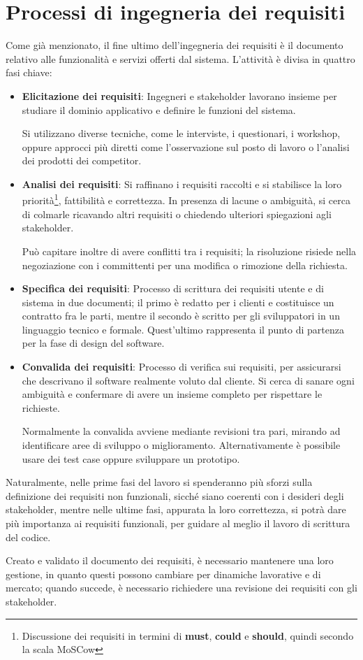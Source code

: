 \section{Processi di ingegneria dei requisiti}
Come già menzionato, il fine ultimo dell'ingegneria dei requisiti è il documento relativo alle funzionalità e servizi offerti dal sistema. L'attività è divisa in quattro fasi chiave: \begin{itemize}
	\item \textbf{Elicitazione dei requisiti}: Ingegneri e stakeholder lavorano insieme per studiare il dominio applicativo e definire le funzioni del sistema.\par
	Si utilizzano diverse tecniche, come le interviste, i questionari, i workshop, oppure approcci più diretti come l'osservazione sul posto di lavoro o l'analisi dei prodotti dei competitor.
	\item \textbf{Analisi dei requisiti}: Si raffinano i requisiti raccolti e si stabilisce la loro priorità\footnote{Discussione dei requisiti in termini di \textbf{must}, \textbf{could} e \textbf{should}, quindi secondo la scala MoSCow}, fattibilità e correttezza. In presenza di lacune o ambiguità, si cerca di colmarle ricavando altri requisiti o chiedendo ulteriori spiegazioni agli stakeholder.\par
	Può capitare inoltre di avere conflitti tra i requisiti; la risoluzione risiede nella negoziazione con i committenti per una modifica o rimozione della richiesta.
	\item \textbf{Specifica dei requisiti}: Processo di scrittura dei requisiti utente e di sistema in due documenti; il primo è redatto per i clienti e costituisce un contratto fra le parti, mentre il secondo è scritto per gli sviluppatori in un linguaggio tecnico e formale. Quest'ultimo rappresenta il punto di partenza per la fase di design del software.
	\item \textbf{Convalida dei requisiti}: Processo di verifica sui requisiti, per assicurarsi che descrivano il software realmente voluto dal cliente. Si cerca di sanare ogni ambiguità e confermare di avere un insieme completo per rispettare le richieste.\par
	Normalmente la convalida avviene mediante revisioni tra pari, mirando ad identificare aree di sviluppo o miglioramento. Alternativamente è possibile usare dei test case oppure sviluppare un prototipo.
\end{itemize}
\noindent Naturalmente, nelle prime fasi del lavoro si spenderanno più sforzi sulla definizione dei requisiti non funzionali, sicché siano coerenti con i desideri degli stakeholder, mentre nelle ultime fasi, appurata la loro correttezza, si potrà dare più importanza ai requisiti funzionali, per guidare al meglio il lavoro di scrittura del codice.\par
Creato e validato il documento dei requisiti, è necessario mantenere una loro gestione, in quanto questi possono cambiare per dinamiche lavorative e di mercato; quando succede, è necessario richiedere una revisione dei requisiti con gli stakeholder.

